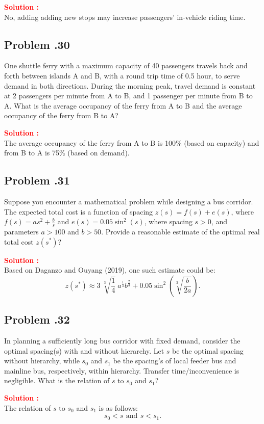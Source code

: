 \documentclass[12pt]{article}
\newcommand{\customsubsection}[1]{
  \subsection*{Problem \thesection.#1}
}
\begin{document}
\textbf{\textcolor{red}{Solution :}} \\
No, adding adding new stops may increase passengers' in-vehicle riding time.



\newpage


\customsubsection{30}
One shuttle ferry with a maximum capacity of 40 passengers travels back and forth between islands A and B, with a round trip time of 0.5 hour, to serve demand in both directions. During the morning peak, travel demand is constant at 2 passengers per minute from A to B, and 1 passenger per minute from B to A. What is the average occupancy of the ferry from A to B and the average occupancy of the ferry from B to A?

\textbf{\textcolor{red}{Solution :}} \\
The average occupancy of the ferry from A to B is 100\% (based on capacity) and from B to A is 75\% (based on demand).


\newpage


\customsubsection{31}
Suppose you encounter a mathematical problem while designing a bus corridor. The expected total cost is a function of spacing $z\left(s\right)=f\left(s\right)+e(s)$, where $f\left(s\right)=a s^2+\frac{b}{s}$ and $e\left(s\right)=0.05\sin^2{(s)}$, where spacing $s>0$, and parameters $a>100$ and $b>50$. Provide a reasonable estimate of the optimal real total cost $z(s^*)$? 


\textbf{\textcolor{red}{Solution :}} \\
Based on Daganzo and Ouyang (2019), one such estimate could be:
\[
z(s^*) \approx 	3\ \sqrt[3]{\frac{1}{4}}\ a^\frac{1}{3}b^\frac{2}{3}+0.05\sin^2{\left(\sqrt[3]{\frac{b}{2a}}\right)}.
\]


\newpage


\customsubsection{32}
In planning a sufficiently long bus corridor with fixed demand, consider the optimal spacing(s) with and without hierarchy. Let $s$ be the optimal spacing without hierarchy, while $s_0$ and $s_1$ be the spacing's of local feeder bus and mainline bus, respectively, within hierarchy. Transfer time/inconvenience is negligible. What is the relation of $s$ to $s_0$ and $s_1$?


\textbf{\textcolor{red}{Solution :}} \\
The relation of $s$ to $s_0$ and $s_1$ is as follows:
\[
s_0 <s \,\ \text{and} \,\ s<s_1.
\]


\newpage
\end{document}
